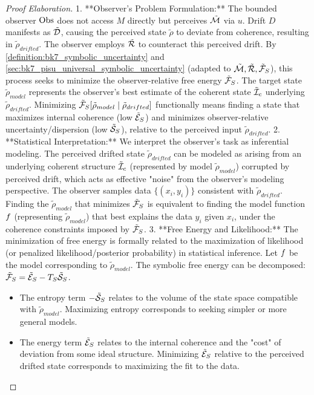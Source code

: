 \begin{proof}[Proof Elaboration]
\label{proof:bk7_proof_elaboration}
1.  **Observer's Problem Formulation:** The bounded observer \( \mathrm{Obs} \) does not access \( M \) directly but perceives \( \tilde{\mathcal{M}} \) via \( u \). Drift \( D \) manifests as \( \tilde{\mathcal{D}} \), causing the perceived state \( \tilde{\rho} \) to deviate from coherence, resulting in \( \tilde{\rho}_{drifted} \). The observer employs \( \tilde{\mathcal{R}} \) to counteract this perceived drift. By \ref{definition:bk7_symbolic_uncertainty} and \ref{sec:bk7_pisu_universal_symbolic_uncertainty} (adapted to \( \tilde{\mathcal{M}}, \tilde{\mathcal{R}}, \tilde{\mathcal{F}}_S \)), this process seeks to minimize the observer-relative free energy \( \tilde{\mathcal{F}}_S \). The target state \( \tilde{\rho}_{model} \) represents the observer's best estimate of the coherent state \( \tilde{\mathcal{I}}_c \) underlying \( \tilde{\rho}_{drifted} \). Minimizing \( \tilde{\mathcal{F}}_S[ \tilde{\rho}_{model} \mid \tilde{\rho}_{drifted} ] \) functionally means finding a state that maximizes internal coherence (low \( \tilde{\mathcal{E}}_S \)) and minimizes observer-relative uncertainty/dispersion (low \( \tilde{\mathcal{S}}_S \)), relative to the perceived input \( \tilde{\rho}_{drifted} \).
2.  **Statistical Interpretation:** We interpret the observer's task as inferential modeling. The perceived drifted state \( \tilde{\rho}_{drifted} \) can be modeled as arising from an underlying coherent structure \( \tilde{\mathcal{I}}_c \) (represented by model \( \tilde{\rho}_{model} \)) corrupted by perceived drift, which acts as effective "noise" from the observer's modeling perspective. The observer samples data \( \{(x_i, y_i)\} \) consistent with \( \tilde{\rho}_{drifted} \). Finding the \( \tilde{\rho}_{model} \) that minimizes \( \tilde{\mathcal{F}}_S \) is equivalent to finding the model function \( f \) (representing \( \tilde{\rho}_{model} \)) that best explains the data \( y_i \) given \( x_i \), under the coherence constraints imposed by \( \tilde{\mathcal{F}}_S \).
3.  **Free Energy and Likelihood:** The minimization of free energy is formally related to the maximization of likelihood (or penalized likelihood/posterior probability) in statistical inference. Let \( f \) be the model corresponding to \( \tilde{\rho}_{model} \). The symbolic free energy can be decomposed: \( \tilde{\mathcal{F}}_S = \tilde{\mathcal{E}}_S - T_S \tilde{\mathcal{S}}_S \).
    \begin{itemize}
        \item The entropy term \( -\tilde{\mathcal{S}}_S \) relates to the volume of the state space compatible with \( \tilde{\rho}_{model} \). Maximizing entropy corresponds to seeking simpler or more general models.
        \item The energy term \( \tilde{\mathcal{E}}_S \) relates to the internal coherence and the "cost" of deviation from some ideal structure. Minimizing \( \tilde{\mathcal{E}}_S \) relative to the perceived drifted state corresponds to maximizing the fit to the data.

\end{itemize}
\end{proof}
